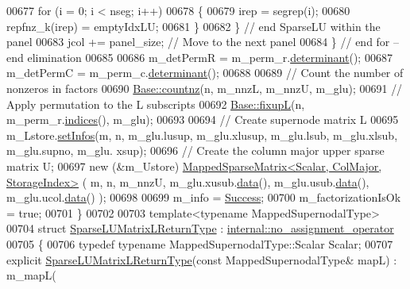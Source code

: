 \begin{DoxyCode}
00677       \textcolor{keywordflow}{for} (i = 0; i < nseg; i++)
00678       \{
00679         irep = segrep(i); 
00680         repfnz\_k(irep) = emptyIdxLU; 
00681       \}
00682     \} \textcolor{comment}{// end SparseLU within the panel  }
00683     jcol += panel\_size;  \textcolor{comment}{// Move to the next panel}
00684   \} \textcolor{comment}{// end for -- end elimination }
00685   
00686   m\_detPermR = m\_perm\_r.\hyperlink{group___core___module_a1fc7a5823544700c2e0795e87f9c6d09}{determinant}();
00687   m\_detPermC = m\_perm\_c.\hyperlink{group___core___module_a1fc7a5823544700c2e0795e87f9c6d09}{determinant}();
00688   
00689   \textcolor{comment}{// Count the number of nonzeros in factors }
00690   \hyperlink{group___sparse_l_u___module_acbede3f259186d48ad42ca093f80b64b}{Base::countnz}(n, m\_nnzL, m\_nnzU, m\_glu); 
00691   \textcolor{comment}{// Apply permutation  to the L subscripts }
00692   \hyperlink{group___sparse_l_u___module_ae1d1ed091956ff4e5734b4e3f79f866e}{Base::fixupL}(n, m\_perm\_r.\hyperlink{group___core___module_a2f1ab379207fcd1ceb33941e25cf50c2}{indices}(), m\_glu);
00693   
00694   \textcolor{comment}{// Create supernode matrix L }
00695   m\_Lstore.\hyperlink{group___sparse_l_u___module_af1427486564e2c75b9da68f98bd04e63}{setInfos}(m, n, m\_glu.lusup, m\_glu.xlusup, m\_glu.lsub, m\_glu.xlsub, m\_glu.supno, m\_glu.
      xsup); 
00696   \textcolor{comment}{// Create the column major upper sparse matrix  U; }
00697   \textcolor{keyword}{new} (&m\_Ustore) \hyperlink{class_eigen_1_1_mapped_sparse_matrix}{MappedSparseMatrix<Scalar, ColMajor, StorageIndex>}
       ( m, n, m\_nnzU, m\_glu.xusub.\hyperlink{class_eigen_1_1_plain_object_base_ac25699535374b1854cf8494e44ad31b2}{data}(), m\_glu.usub.\hyperlink{class_eigen_1_1_plain_object_base_ac25699535374b1854cf8494e44ad31b2}{data}(), m\_glu.ucol.\hyperlink{class_eigen_1_1_plain_object_base_ac25699535374b1854cf8494e44ad31b2}{data}() );
00698   
00699   m\_info = \hyperlink{group__enums_gga85fad7b87587764e5cf6b513a9e0ee5ea52581b035f4b59c203b8ff999ef5fcea}{Success};
00700   m\_factorizationIsOk = \textcolor{keyword}{true};
00701 \}
00702 
00703 \textcolor{keyword}{template}<\textcolor{keyword}{typename} MappedSupernodalType>
00704 \textcolor{keyword}{struct }\hyperlink{struct_eigen_1_1_sparse_l_u_matrix_l_return_type}{SparseLUMatrixLReturnType} : 
      \hyperlink{class_eigen_1_1internal_1_1no__assignment__operator}{internal::no\_assignment\_operator}
00705 \{
00706   \textcolor{keyword}{typedef} \textcolor{keyword}{typename} MappedSupernodalType::Scalar Scalar;
00707   \textcolor{keyword}{explicit} \hyperlink{struct_eigen_1_1_sparse_l_u_matrix_l_return_type}{SparseLUMatrixLReturnType}(\textcolor{keyword}{const} MappedSupernodalType& mapL) : m\_mapL(

\end{DoxyCode}

